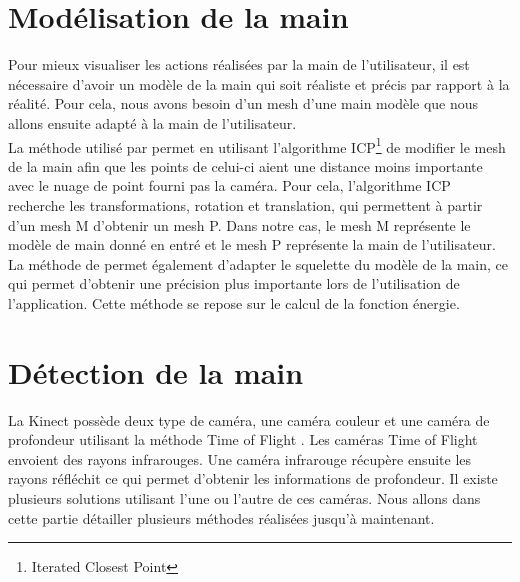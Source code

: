 \section{Modélisation de la main}
Pour mieux visualiser les actions réalisées par la main de l'utilisateur, il est nécessaire d'avoir
un modèle de la main qui soit réaliste et précis par rapport à la réalité. Pour cela, nous avons besoin d'un
mesh d'une main modèle que nous allons ensuite adapté à la main de l'utilisateur.\\

La méthode utilisé par \cite{export:217428} permet en utilisant l'algorithme
ICP\footnote{Iterated Closest Point} \cite{121791} de modifier le mesh de la main afin
que les points de celui-ci aient une distance moins importante avec le nuage de point fourni pas la 
caméra. Pour cela, l'algorithme ICP recherche les transformations, rotation et translation, qui permettent 
à partir d'un mesh M d'obtenir un mesh P. Dans notre cas, le mesh M représente le modèle de main donné en entré
et le mesh P représente la main de l'utilisateur.\\ 

La méthode de \cite{export:217428} permet également d'adapter le squelette du modèle de la 
main, ce qui permet d'obtenir une précision plus importante lors de l'utilisation de l'application.
Cette méthode se repose sur le calcul de la fonction énergie.

\section{Détection de la main}

La Kinect possède deux type de caméra, une caméra couleur et une caméra de profondeur utilisant la méthode 
\og Time of Flight \fg. Les caméras \og Time of Flight \fg envoient des rayons infrarouges. Une caméra infrarouge
récupère ensuite les rayons réfléchit ce qui permet d'obtenir les informations de profondeur. 
Il existe plusieurs solutions utilisant l'une ou l'autre de ces caméras. Nous allons
dans cette partie détailler plusieurs méthodes réalisées jusqu'à maintenant.

